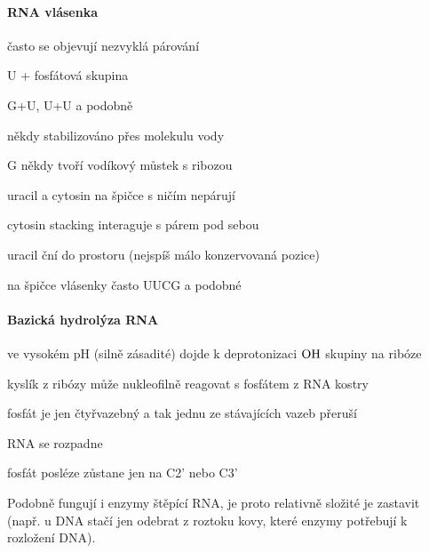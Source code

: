\documentclass[DIV=8]{scrreprt}
\begin{document}
\paragraph{RNA vlásenka}
\begin{myItemize}[nosep]
    \item často se objevují nezvyklá párování
\begin{myItemize}[nosep]
    \item U + fosfátová skupina
    \item G+U, U+U a podobně
\begin{myItemize}[nosep]
    \item někdy stabilizováno přes molekulu vody
\end{myItemize}

    \item G někdy tvoří vodíkový můstek s ribozou
\end{myItemize}

    \item uracil a cytosin na špičce s ničím nepárují
\begin{myItemize}[nosep]
    \item cytosin stacking interaguje s párem pod sebou
    \item uracil ční do prostoru (nejspíš málo konzervovaná pozice)
\end{myItemize}

    \item na špičce vlásenky často UUCG a podobné
\end{myItemize}



\paragraph{Bazická hydrolýza RNA}
\begin{myEnumerate}[nosep]
    \item ve vysokém pH (silně zásadité) dojde k deprotonizaci \(\ce{OH}\) skupiny na ribóze
    \item kyslík z ribózy může nukleofilně reagovat s fosfátem z RNA kostry
    \item fosfát je jen čtyřvazebný a tak jednu ze stávajících vazeb přeruší
    \item RNA se rozpadne
    \item fosfát posléze zůstane jen na C2' nebo C3'
\end{myEnumerate}



Podobně fungují i enzymy štěpící RNA, je proto relativně složité je zastavit (např. u DNA stačí jen odebrat z roztoku kovy, které enzymy potřebují k rozložení DNA).
\end{document}
